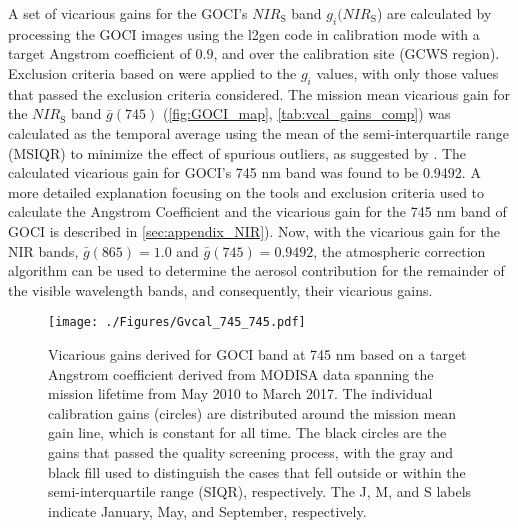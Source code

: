 \documentclass[]{interact}
\theoremstyle{plain}%
\theoremstyle{definition}
\theoremstyle{remark}
\begin{document}
A set of vicarious gains for the GOCI's $NIR_\text{S}$ band $g_i(NIR_\text{S}$) are calculated by processing the GOCI images using the l2gen code in calibration mode with a target Angstrom coefficient of $0.9$, and over the calibration site (GCWS region). Exclusion criteria based on \citep{Bailey2006} were applied to the $g_i$ values, with only those values that passed the exclusion criteria considered. The mission mean vicarious gain for the $NIR_\text{S}$ band $\bar{g}(745)$ (\autoref{fig:GOCI_map}, \autoref{tab:vcal_gains_comp}) was calculated as the temporal average using the mean of the semi-interquartile range (MSIQR) to minimize the effect of spurious outliers, as suggested by \citep{Franz:07}. The calculated vicarious gain for GOCI's 745 nm band was found to be 0.9492. A more detailed explanation focusing on the tools and exclusion criteria used to calculate the Angstrom Coefficient and the vicarious gain for the 745 nm band of GOCI is described in  \autoref{sec:appendix_NIR}). Now, with the vicarious gain for the NIR bands, $\bar{g}(865)=1.0$ and $\bar{g}(745)=0.9492$, the atmospheric correction algorithm can be used to determine the aerosol contribution for the remainder of the visible wavelength bands, and consequently, their vicarious gains. 




\begin{figure}[H]
  \centering
  \texttt{[image: ./Figures/Gvcal\_745\_745.pdf]}
    \caption{Vicarious gains derived for GOCI band at 745 nm based on a target Angstrom coefficient derived from MODISA data spanning the mission lifetime from May 2010 to March 2017. The individual calibration gains (circles) are distributed around the mission mean gain line, which is constant for all time. The black circles are the gains that passed the quality screening process, with the gray and black fill used to distinguish the cases that fell outside or within the semi-interquartile range (SIQR), respectively. The J, M, and S labels indicate January, May, and September, respectively. \label{fig:Gvcal_745}} 
\end{figure}
\end{document}
